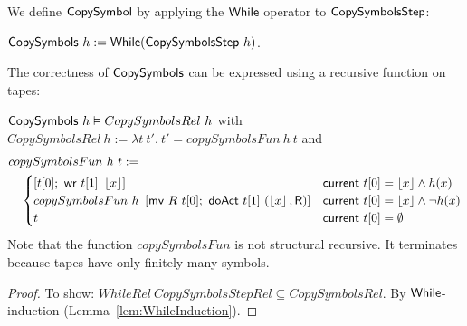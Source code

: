 We define $\mathsf{CopySymbol}$ by applying the $\mathsf{While}$ operator to $\mathsf{CopySymbolsStep}$:
\begin{definition}[$\MS{CopySymbols}$][CopySymbols]
  \label{def:CopySymbols}
  $\mathsf{CopySymbols}~h := \mathsf{While}(\mathsf{CopySymbolsStep}~h)$.
\end{definition}

The correctness of $\MS{CopySymbols}$ can be expressed using a recursive function on tapes:
\begin{lemma}
  \label{lem:CopySymbols_Realise}
  $\mathsf{CopySymbols}~h \mathrel{\vDash} CopySymbolsRel~h$
  with $CopySymbolsRel~h := \lambda t~t'.~t' = copySymbolsFun~h~t$ and
  {
    \small
    \begin{align*}
      &copySymbolsFun~h~t :=\\
      &\quad\begin{cases}
        \left[ t[0];~ \mathsf{wr}~t[1]~\left\lfloor {x} \right\rfloor \right]                                         & \mathsf{current}~t[0]=\left\lfloor {x} \right\rfloor \land h(x) \\
        copySymbolsFun~h~\left[ \mathsf{mv}~R~t[0];~ \mathsf{doAct}~t[1]~(\left\lfloor {x} \right\rfloor, \mathsf{R}) \right] & \mathsf{current}~t[0]=\left\lfloor {x} \right\rfloor \land \lnot h(x) \\
        t                                                                             & \mathsf{current}~t[0]=\emptyset
      \end{cases}
    \end{align*}
  }
  Note that the function $copySymbolsFun$ is not structural recursive.  It terminates because tapes have only finitely many symbols.
\end{lemma}
\begin{proof}
  To show: $WhileRel~CopySymbolsStepRel \subseteq CopySymbolsRel$.  By $\mathsf{While}$-induction (Lemma~\ref{lem:WhileInduction}).
\end{proof}

